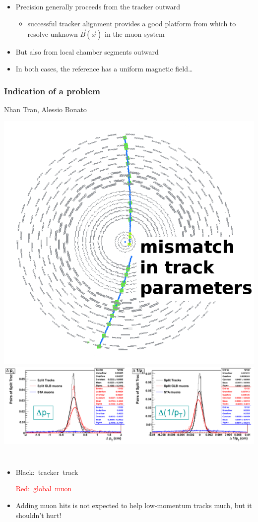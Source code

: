\documentclass[compress]{beamer}
\begin{document}
\begin{frame}
\vfill
\begin{itemize}
\item Precision generally proceeds from the tracker outward
\begin{itemize}\setlength{\itemsep}{0.2 cm}
\item successful tracker alignment provides a good platform from which
  to resolve unknown $\vec{B}(\vec{x})$ in the muon system
\end{itemize}
\item But also from local chamber segments outward
\item In both cases, the reference has a uniform magnetic field\ldots
\end{itemize}
\end{frame}

\begin{frame}
\frametitle{Indication of a problem}

\hfill {\tiny Nhan Tran, Alessio Bonato}

\includegraphics[height=2.6 cm]{matching.png} \includegraphics[height=2.6 cm]{mismatch2.png}

\begin{columns}
\begin{itemize}
\item \mbox{Black: tracker track\hspace{-1 cm}}

\textcolor{red}{\mbox{Red: global muon\hspace{-1 cm}}}
\item Adding muon hits is not expected to help low-momentum tracks much, but it shouldn't hurt!
\end{itemize}



\end{columns}
\end{frame}
\end{document}
